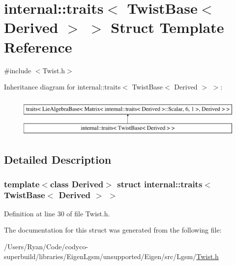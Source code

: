 \hypertarget{structinternal_1_1traits_3_01_twist_base_3_01_derived_01_4_01_4}{}\section{internal\+:\+:traits$<$ Twist\+Base$<$ Derived $>$ $>$ Struct Template Reference}
\label{structinternal_1_1traits_3_01_twist_base_3_01_derived_01_4_01_4}


{\ttfamily \#include $<$Twist.\+h$>$}

Inheritance diagram for internal\+:\+:traits$<$ Twist\+Base$<$ Derived $>$ $>$\+:\begin{figure}[H]
\begin{center}
\leavevmode
\includegraphics[height=2.000000cm]{structinternal_1_1traits_3_01_twist_base_3_01_derived_01_4_01_4}
\end{center}
\end{figure}


\subsection{Detailed Description}
\subsubsection*{template$<$class Derived$>$\newline
struct internal\+::traits$<$ Twist\+Base$<$ Derived $>$ $>$}



Definition at line 30 of file Twist.\+h.



The documentation for this struct was generated from the following file\+:\begin{DoxyCompactItemize}
\item 
/\+Users/\+Ryan/\+Code/codyco-\/superbuild/libraries/\+Eigen\+Lgsm/unsupported/\+Eigen/src/\+Lgsm/\hyperlink{_twist_8h}{Twist.\+h}\end{DoxyCompactItemize}
